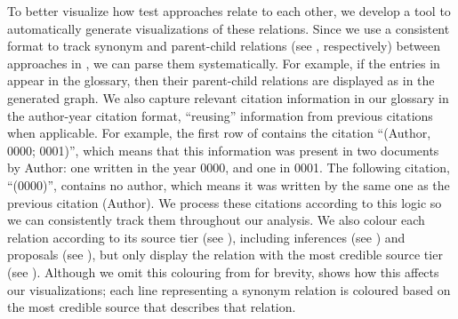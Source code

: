 To better visualize how test approaches relate to each other, we
develop a tool to automatically generate visualizations of these relations.
\ifnotpaper
    Since we use a consistent format to track synonym and parent-child
    relations (see , respectively)
    between approaches in \ourApproachGlossary{}, we can parse them
    systematically. For example, if the entries in 
    appear in the glossary, then their parent-child relations are displayed as
     in the generated graph. We also capture relevant
    citation information in our glossary in the author-year citation format,
    ``reusing'' information from previous citations when applicable.
    For example, the first row of 
    contains the citation ``(Author, 0000; 0001)'', which means that this
    information was present in two documents by Author: one written in
    the year 0000, and one in 0001. The following citation, ``(0000)'',
    contains no author, which means it was written by the same one as the
    previous citation (Author). We process these citations according to this
    logic  so we can
    consistently track them throughout our analysis. We also colour each
    relation according to its source tier (see ), including
    inferences (see ) and proposals (see ), but only
    display the relation with the most credible source tier (see ).
    Although we omit this colouring from  for brevity,  shows how
    this affects our visualizations; each line representing a synonym relation
    is coloured based on the most credible source that describes that relation.

